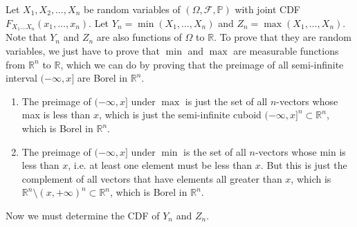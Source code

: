 \documentclass{article}
\begin{document}
      Let $X_1, X_2, \ldots, X_n$ be random variables of $(\Omega, \mathcal{F}, \mathbb{P})$ with joint CDF $F_{X_1 \ldots X_n} (x_1, \ldots, x_n)$. Let $Y_n = \min (X_1, \ldots, X_n)$ and $Z_n = \max(X_1, \ldots, X_n)$. Note that $Y_n$ and $Z_n$ are also functions of $\Omega$ to $\mathbb{R}$. To prove that they are random variables, we just have to prove that $\min$ and $\max$ are measurable functions from $\mathbb{R}^n$ to $\mathbb{R}$, which we can do by proving that the preimage of all semi-infinite interval $(-\infty, x]$ are Borel in $\mathbb{R}^n$. 
      \begin{enumerate}
        \item The preimage of $(-\infty, x]$ under $\max$ is just the set of all $n$-vectors whose max is less than $x$, which is just the semi-infinite cuboid $(-\infty, x]^n \subset \mathbb{R}^n$, which is Borel in $\mathbb{R}^n$. 
        \item The preimage of $(-\infty, x]$ under $\min$ is the set of all $n$-vectors whose min is less than $x$, i.e. at least one element must be less than $x$. But this is just the complement of all vectors that have elements all greater than $x$, which is $\mathbb{R}^n \setminus (x, +\infty)^n \subset \mathbb{R}^n$, which is Borel in $\mathbb{R}^n$. 
      \end{enumerate}
      Now we must determine the CDF of $Y_n$ and $Z_n$. 
\end{document}
